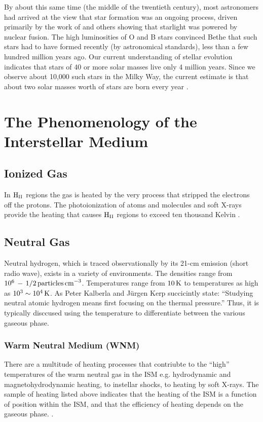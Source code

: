 \documentclass[../dissertation.tex]{subfiles}
\begin{document}
By about this same time (the middle of the twentieth century), most astronomers had arrived at the view that star formation was an ongoing process, 
driven primarily by the work of \citet{1939PhRv...55..434B}
and others showing that starlight was powered by nuclear fusion. 
The high luminosities of O and B stars convinced Bethe that such stars had to have formed recently (by astronomical standards), less than a few hundred million years ago. 
Our current understanding of stellar evolution indicates that stars of 40 or more solar masses live only 4 million years. 
Since we observe about 10,000 such stars in the Milky Way, the current estimate is that about two solar masses worth of stars are born every year \citep{2011AJ....142..197C}. 

\section{The Phenomenology of the Interstellar Medium}

\subsection{Ionized Gas}
In ${\rm H}_{\rm II}$ regions the gas is heated by the very process that stripped the electrons off the protons. 
The photoionization of atoms and molecules and soft X-rays provide the heating that causes ${\rm H}_{\rm II}$ 
regions to exceed ten thousand Kelvin \citep[p. 47]{2009ARA&A..47...27K}.

\subsection{Neutral Gas}
Neutral hydrogen, which is traced observationally by its 21-cm emission (short radio wave), exists in a variety of environments. 
The densities range from $10^6 \,  - \, 1/2 \, {\rm particles \, cm}^{-3}$.
Temperatures range from $10 \, {\rm K}$ to temperatures as high as $10^3 \sim 10^4 \, {\rm K}$. 
As Peter Kalberla and J{\"u}rgen Kerp succicintly state: 
``Studying neutral atomic hydrogen means first focusing on the thermal pressure.'' \citep[p. 47]{2009ARA&A..47...27K}
Thus, it is typically disccused using the temperature to differentiate between the various gaseous phase. %

\subsubsection{Warm Neutral Medium (WNM)} %
There are a multitude of heating processes that contriubte to the ``high'' temperatures of the warm neutral gas in the ISM e.g. hydrodynamic and magnetohydrodynamic heating, to instellar shocks, to heating by soft X-rays.
The sample of heating listed above indicates that the heating of the ISM is a function of position within the ISM, 
and that the efficiency of heating depends on the gaseous phase. \citep[p. 48]{2009ARA&A..47...27K}.
\end{document}
